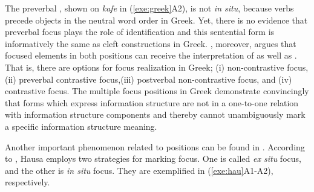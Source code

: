 

\noindent The preverbal , shown on \textit{kafe} in
(\ref{exe:greek}A2), is not \textit{in situ}, because verbs precede
objects in the neutral word order in Greek.  Yet, there is no evidence
that preverbal focus plays the role of identification and this
sentential form is informatively the same as cleft constructions in
Greek.  \citeauthor{gryllia:09}, moreover, argues that focused
elements in both positions can receive the interpretation of
 as well as .
That is, there are options for focus realization in Greek; (i) 
non-contrastive focus, (ii) preverbal contrastive focus,(iii)
postverbal non-contrastive focus, and (iv) 
contrastive focus. The multiple focus positions in Greek demonstrate
convincingly that forms which express information structure are not in
a one-to-one relation with information structure components and
thereby cannot unambiguously mark a specific information structure
meaning.









Another important phenomenon related to  positions can be found
in .  According to \citet{hartmann:zimmermann:07}, Hausa
employs two strategies for marking focus. One is called \textit{ex
  situ} focus, and the other is \textit{in situ} focus. They are
exemplified in (\ref{exe:hau}A1-A2), respectively.


